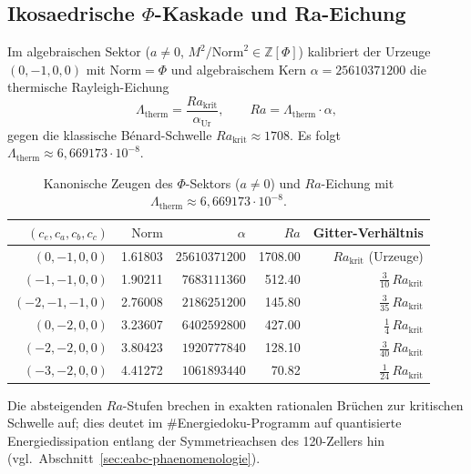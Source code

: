 \subsection{Ikosaedrische $\Phi$-Kaskade und Ra-Eichung}\label{sec:eabc-zeugen-phi}

Im algebraischen Sektor ($a\neq 0$, $M^2/\mathrm{Norm}^2\in\mathbb{Z}[\Phi]$) kalibriert der Urzeuge $(0,-1,0,0)$ mit $\mathrm{Norm}=\Phi$ und algebraischem Kern $\alpha=25610371200$ die thermische Rayleigh-Eichung
\[
  \Lambda_{\mathrm{therm}} = \frac{Ra_{\mathrm{krit}}}{\alpha_{\mathrm{Ur}}},
  \qquad
  Ra = \Lambda_{\mathrm{therm}}\cdot\alpha,
\]
gegen die klassische Bénard-Schwelle $Ra_{\mathrm{krit}}\approx 1708$. Es folgt $\Lambda_{\mathrm{therm}}\approx 6{,}669173\cdot 10^{-8}$.

\begin{table}[ht]
  \centering
  \caption{Kanonische Zeugen des $\Phi$-Sektors ($a\neq 0$) und $Ra$-Eichung mit $\Lambda_{\mathrm{therm}}\approx 6{,}669173\cdot 10^{-8}$.}
  \label{tab:eabc-phi}
  \begin{tabular}{rrrrr}
    \toprule
    $(c_e,c_a,c_b,c_c)$ & $\mathrm{Norm}$ & $\alpha$ & $Ra$ & Gitter-Verhältnis \\
    \midrule
    $(0, -1, 0, 0)$ & 1.61803 & $25610371200$ & 1708.00 & $Ra_{\mathrm{krit}}$ (Urzeuge) \\
    $(-1, -1, 0, 0)$ & 1.90211 & $7683111360$ & 512.40 & $\tfrac{3}{10}\,Ra_{\mathrm{krit}}$ \\
    $(-2, -1, -1, 0)$ & 2.76008 & $2186251200$ & 145.80 & $\tfrac{3}{35}\,Ra_{\mathrm{krit}}$ \\
    $(0, -2, 0, 0)$ & 3.23607 & $6402592800$ & 427.00 & $\tfrac{1}{4}\,Ra_{\mathrm{krit}}$ \\
    $(-2, -2, 0, 0)$ & 3.80423 & $1920777840$ & 128.10 & $\tfrac{3}{40}\,Ra_{\mathrm{krit}}$ \\
    $(-3, -2, 0, 0)$ & 4.41272 & $1061893440$ & 70.82 & $\tfrac{1}{24}\,Ra_{\mathrm{krit}}$ \\
    \bottomrule
  \end{tabular}
\end{table}

Die absteigenden $Ra$-Stufen brechen in exakten rationalen Brüchen zur kritischen Schwelle auf; dies deutet im \#Energiedoku-Programm auf quantisierte Energiedissipation entlang der Symmetrieachsen des 120-Zellers hin (vgl.\ Abschnitt~\ref{sec:eabc-phaenomenologie}).
